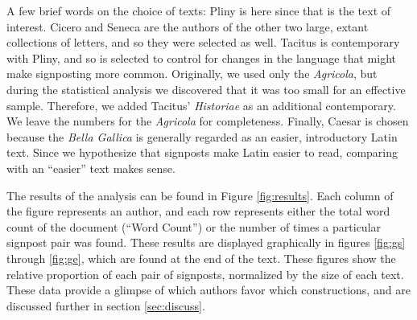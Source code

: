 A few brief words on the choice of texts: Pliny is here since that is the text of interest. Cicero and Seneca are the authors of the other two large, extant collections of letters, and so they were selected as well. Tacitus is contemporary with Pliny, and so is selected to control for changes in the language that might make signposting more common. Originally, we used only the \textit{Agricola}, but during the statistical analysis we discovered that it was too small for an effective sample. Therefore, we added Tacitus' \textit{Historiae} as an additional contemporary. We leave the numbers for the \textit{Agricola} for completeness. Finally, Caesar is chosen because the \textit{Bella Gallica} is generally regarded as an easier, introductory Latin text. Since we hypothesize that signposts make Latin easier to read, comparing with an ``easier'' text makes sense.

The results of the analysis can be found in Figure \ref{fig:results}. Each column of the figure represents an author, and each row represents either the total word count of the document (``Word Count'') or the number of times a particular signpost pair was found. These results are displayed graphically in figures \ref{fig:gs} through \ref{fig:ge}, which are found at the end of the text. These figures show the relative proportion of each pair of signposts, normalized by the size of each text. These data provide a glimpse of which authors favor which constructions, and are discussed further in section \ref{sec:discuss}.

